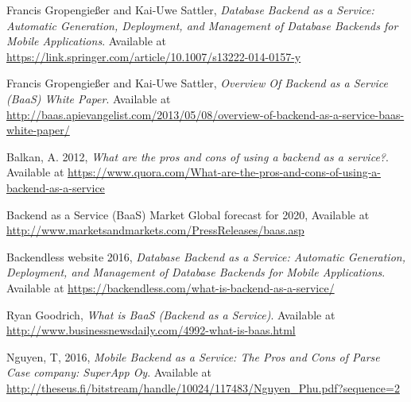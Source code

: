 \documentclass[a4paper]{report}
\begin{document}
    \begin{thebibliography}{9}
    	Francis Gropengießer and Kai-Uwe Sattler,
      \emph{Database Backend as a Service: Automatic Generation, Deployment, and Management of Database Backends for Mobile Applications}.
			Available at \underline{https://link.springer.com/article/10.1007/s13222-014-0157-y}
			
    	Francis Gropengießer and Kai-Uwe Sattler,
      \emph{Overview Of Backend as a Service (BaaS) White Paper}.
			Available at \underline{http://baas.apievangelist.com/2013/05/08/overview-of-backend-as-a-service-baas-white-paper/}
			
								
			Balkan, A. 2012,
      \emph{What are the pros and cons of using a backend as a service?}.
			Available at \underline{https://www.quora.com/What-are-the-pros-and-cons-of-using-a-backend-as-a-service}			
		
			Backend as a Service (BaaS) Market Global forecast for 2020,
			Available at \underline{http://www.marketsandmarkets.com/PressReleases/baas.asp}		
		
			Backendless website 2016,
      \emph{Database Backend as a Service: Automatic Generation, Deployment, and Management of Database Backends for Mobile Applications}.
			Available at \underline{https://backendless.com/what-is-backend-as-a-service/}
	

			Ryan Goodrich,
      \emph{What is BaaS (Backend as a Service)}.
			Available at \underline{http://www.businessnewsdaily.com/4992-what-is-baas.html}	
			
			Nguyen, T, 2016,
      \emph{Mobile Backend as a Service: The Pros and Cons of Parse
			Case company: SuperApp Oy}.
			Available at \underline{http://theseus.fi/bitstream/handle/10024/117483/Nguyen{\_}Phu.pdf?sequence=2}
		
		\end{thebibliography}	
    
\end{document}
